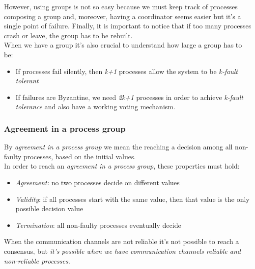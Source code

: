 However, using groups is not so easy because we must keep track of
processes composing a group and, moreover, having a coordinator seems easier but it's a single point of failure.
Finally, it is important to notice that if too many processes crash or leave, the group has to be rebuilt.\\
When we have a group it's also crucial to understand how large a group has to be:

\begin{itemize}
\itemsep1pt\parskip0pt
\item
  If processes fail silently, then \emph{k+1} processes allow the system
  to be \emph{k-fault tolerant}
\item
  If failures are Byzantine, we need \emph{2k+1} processes in order to
  achieve \emph{k-fault tolerance} and also have a working voting
  mechanism.
\end{itemize}

\subsubsection{Agreement in a process group}\label{agreement-in-a-process-group}
By \textit{agreement in a process group} we mean the reaching a decision among all non-faulty processes, based on the initial values.\\
In order to reach an \textit{agreement in a process group}, these properties must hold:

\begin{itemize}
\itemsep1pt\parskip0pt
\item
  \emph{Agreement:} no two processes decide on different values
\item
  \emph{Validity}: if all processes start with the same value, then that
  value is the only possible decision value
\item
  \emph{Termination}: all non-faulty processes eventually decide
\end{itemize}

When the communication channels are not reliable it's not possible to
reach a consensus, but \textit{it's possible when we have communication channels reliable and non-reliable processes.}

